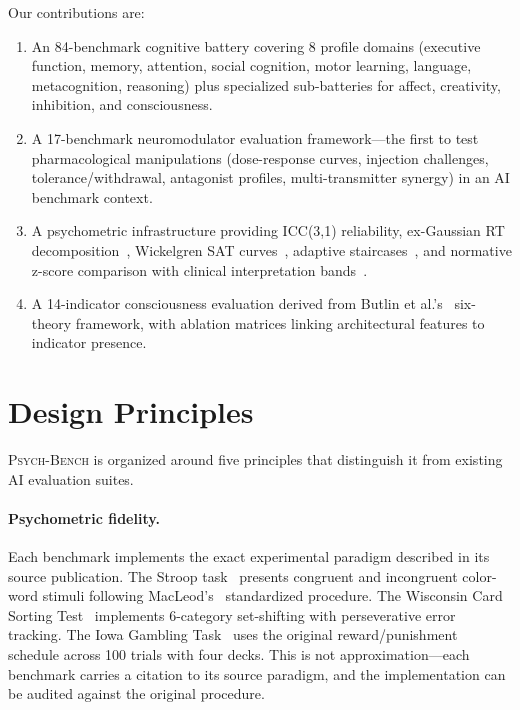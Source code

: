 \documentclass[11pt,letterpaper]{article}
\newcommand{\psychbench}{\textsc{Psych-Bench}}
\begin{document}
Our contributions are:
\begin{enumerate}[nosep]
    \item An 84-benchmark cognitive battery covering 8 profile domains (executive function, memory, attention, social cognition, motor learning, language, metacognition, reasoning) plus specialized sub-batteries for affect, creativity, inhibition, and consciousness.
    \item A 17-benchmark neuromodulator evaluation framework---the first to test pharmacological manipulations (dose-response curves, injection challenges, tolerance/withdrawal, antagonist profiles, multi-transmitter synergy) in an AI benchmark context.
    \item A psychometric infrastructure providing ICC(3,1) reliability, ex-Gaussian RT decomposition~\citep{heathcote1996fitting}, Wickelgren SAT curves~\citep{wickelgren1977speed}, adaptive staircases~\citep{levitt1971transformed}, and normative z-score comparison with clinical interpretation bands~\citep{cicchetti1994guidelines}.
    \item A 14-indicator consciousness evaluation derived from Butlin et al.'s~\citep{butlin2023consciousness} six-theory framework, with ablation matrices linking architectural features to indicator presence.
\end{enumerate}

\section{Design Principles}
\label{sec:principles}

\psychbench{} is organized around five principles that distinguish it from existing AI evaluation suites.

\paragraph{Psychometric fidelity.} Each benchmark implements the exact experimental paradigm described in its source publication. The Stroop task~\citep{stroop1935interference} presents congruent and incongruent color-word stimuli following MacLeod's~\citep{macleod1991half} standardized procedure. The Wisconsin Card Sorting Test~\citep{berg1948simple} implements 6-category set-shifting with perseverative error tracking. The Iowa Gambling Task~\citep{bechara1994insensitivity} uses the original reward/punishment schedule across 100 trials with four decks. This is not approximation---each benchmark carries a citation to its source paradigm, and the implementation can be audited against the original procedure.
\end{document}
